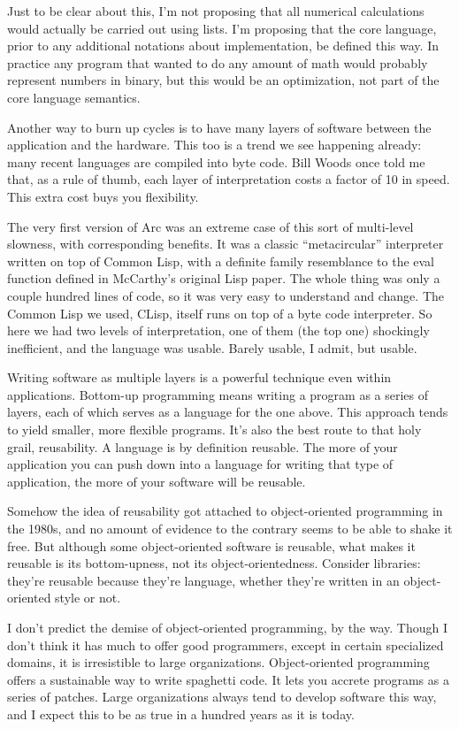 Just to be clear about this, I'm not proposing that all numerical
calculations would actually be carried out using lists. I'm proposing
that the core language, prior to any additional notations about
implementation, be defined this way. In practice any program that wanted
to do any amount of math would probably represent numbers in binary, but
this would be an optimization, not part of the core language semantics.

Another way to burn up cycles is to have many layers of software between
the application and the hardware. This too is a trend we see happening
already: many recent languages are compiled into byte code. Bill Woods
once told me that, as a rule of thumb, each layer of interpretation
costs a factor of 10 in speed. This extra cost buys you flexibility.

The very first version of Arc was an extreme case of this sort of
multi-level slowness, with corresponding benefits. It was a classic
``metacircular'' interpreter written on top of Common Lisp, with a
definite family resemblance to the eval function defined in McCarthy's
original Lisp paper. The whole thing was only a couple hundred lines of
code, so it was very easy to understand and change. The Common Lisp we
used, CLisp, itself runs on top of a byte code interpreter. So here we
had two levels of interpretation, one of them (the top one) shockingly
inefficient, and the language was usable. Barely usable, I admit, but
usable.

Writing software as multiple layers is a powerful technique even within
applications. Bottom-up programming means writing a program as a series
of layers, each of which serves as a language for the one above. This
approach tends to yield smaller, more flexible programs. It's also the
best route to that holy grail, reusability. A language is by definition
reusable. The more of your application you can push down into a language
for writing that type of application, the more of your software will be
reusable.

Somehow the idea of reusability got attached to object-oriented
programming in the 1980s, and no amount of evidence to the contrary
seems to be able to shake it free. But although some object-oriented
software is reusable, what makes it reusable is its bottom-upness, not
its object-orientedness. Consider libraries: they're reusable because
they're language, whether they're written in an object-oriented style or
not.

I don't predict the demise of object-oriented programming, by the way.
Though I don't think it has much to offer good programmers, except in
certain specialized domains, it is irresistible to large organizations.
Object-oriented programming offers a sustainable way to write spaghetti
code. It lets you accrete programs as a series of patches. Large
organizations always tend to develop software this way, and I expect
this to be as true in a hundred years as it is today.

